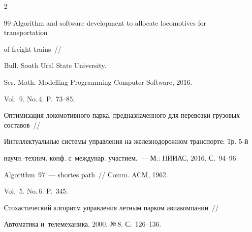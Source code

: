 \begin{multicols}{2}
{{\begin{thebibliography}{99}
Algorithm and software development to allocate locomotives for transportation 


of freight trains~//




Bull. South Ural State University. 


Ser. Math. Modelling Programming  Computer Software, 2016. 


Vol.~9. No.\,4. P.~73--85.









Оптимизация локомотивного парка, предназначенного для перевозки грузовых составов~// 


Интеллектуальные системы управ\-ле\-ния на железнодорожном транспорте: Тр. 5-й\linebreak 


на\-учн.-тех\-нич. конф. с~междунар. участием.~--- М.: \mbox{НИИАС}, 2016. С.~94--96.


    







 Algorithm~97~--- shortes path~// Comm. ACM, 1962. 


Vol.~5. No.\,6. P.~345.









Стохастический алгоритм управления летным парком авиакомпании~// 


Автоматика и~телемеханика, 2000. №\,8. С.~126--136.





 \end{thebibliography}





 }


 }





\end{multicols}





